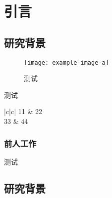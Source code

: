 \chapter{引言}

\section{研究背景}
\begin{figure}[tbh]
  \centering
  \texttt{[image: example-image-a]}
  \caption{测试}
\end{figure}
\begin{table}[tbh]
  \caption{测试}
  \centering
  \begin{tblr}{|c|c|}
    11 & 22 \\
    33 & 44 
  \end{tblr}
\end{table}



\subsection{前人工作}


测试 \parencite{邱泽奇建构与分化} %
\section{研究背景}
